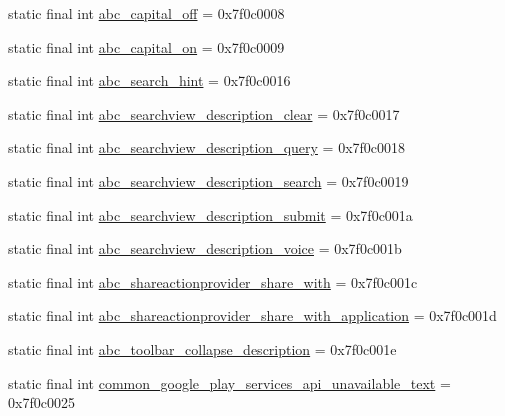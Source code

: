 \begin{DoxyCompactItemize}
\item 
static final int \mbox{\hyperlink{classcom_1_1google_1_1android_1_1gms_1_1R_1_1string_af2329b8780624d9363cd8d4344a91045}{abc\+\_\+capital\+\_\+off}} = 0x7f0c0008
\item 
static final int \mbox{\hyperlink{classcom_1_1google_1_1android_1_1gms_1_1R_1_1string_aee0420ef3add07f07222d614526435ef}{abc\+\_\+capital\+\_\+on}} = 0x7f0c0009
\item 
static final int \mbox{\hyperlink{classcom_1_1google_1_1android_1_1gms_1_1R_1_1string_a9bd9f25fd28c8da6f8c7ebf21529916d}{abc\+\_\+search\+\_\+hint}} = 0x7f0c0016
\item 
static final int \mbox{\hyperlink{classcom_1_1google_1_1android_1_1gms_1_1R_1_1string_a040968328fc1712e817f10760f858402}{abc\+\_\+searchview\+\_\+description\+\_\+clear}} = 0x7f0c0017
\item 
static final int \mbox{\hyperlink{classcom_1_1google_1_1android_1_1gms_1_1R_1_1string_a6e4763569f112b13763f3e68dd2551cd}{abc\+\_\+searchview\+\_\+description\+\_\+query}} = 0x7f0c0018
\item 
static final int \mbox{\hyperlink{classcom_1_1google_1_1android_1_1gms_1_1R_1_1string_ab5c268aee959e1faed25059c6fc77499}{abc\+\_\+searchview\+\_\+description\+\_\+search}} = 0x7f0c0019
\item 
static final int \mbox{\hyperlink{classcom_1_1google_1_1android_1_1gms_1_1R_1_1string_afc3a7b3d6ffe3ff02fe5e11114fe64de}{abc\+\_\+searchview\+\_\+description\+\_\+submit}} = 0x7f0c001a
\item 
static final int \mbox{\hyperlink{classcom_1_1google_1_1android_1_1gms_1_1R_1_1string_a367fbcd06c1a4f359624cdf262e20f06}{abc\+\_\+searchview\+\_\+description\+\_\+voice}} = 0x7f0c001b
\item 
static final int \mbox{\hyperlink{classcom_1_1google_1_1android_1_1gms_1_1R_1_1string_af81c4624f2652a5a33202544a0ab80cb}{abc\+\_\+shareactionprovider\+\_\+share\+\_\+with}} = 0x7f0c001c
\item 
static final int \mbox{\hyperlink{classcom_1_1google_1_1android_1_1gms_1_1R_1_1string_aefd261f4c9337ac1965eeac51953b37b}{abc\+\_\+shareactionprovider\+\_\+share\+\_\+with\+\_\+application}} = 0x7f0c001d
\item 
static final int \mbox{\hyperlink{classcom_1_1google_1_1android_1_1gms_1_1R_1_1string_abb41fa40aca4f3f830fc2833ef86556b}{abc\+\_\+toolbar\+\_\+collapse\+\_\+description}} = 0x7f0c001e
\item 
static final int \mbox{\hyperlink{classcom_1_1google_1_1android_1_1gms_1_1R_1_1string_a76bdba86e142060f64ae25420871d986}{common\+\_\+google\+\_\+play\+\_\+services\+\_\+api\+\_\+unavailable\+\_\+text}} = 0x7f0c0025

\end{DoxyCompactItemize}
